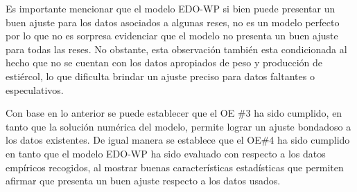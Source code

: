 Es importante mencionar que el modelo EDO-WP si bien puede presentar un buen ajuste para los datos asociados a algunas reses, no es un modelo perfecto por lo que no es sorpresa evidenciar que el modelo no presenta un buen ajuste para todas las reses. No obstante, esta observación también esta condicionada al hecho que no se cuentan con los datos apropiados de peso y producción de estiércol, lo que dificulta brindar un ajuste preciso para datos faltantes o especulativos.

Con base en lo anterior se puede establecer que el OE \#3 ha sido cumplido, en tanto que la solución numérica del modelo, permite lograr un ajuste bondadoso a los datos existentes. De igual manera se establece que el OE\#4 ha sido cumplido en tanto que el modelo EDO-WP ha sido evaluado con respecto a los datos empíricos recogidos, al mostrar buenas características estadísticas que permiten afirmar que presenta un buen ajuste respecto a los datos usados.

\pagebreak


